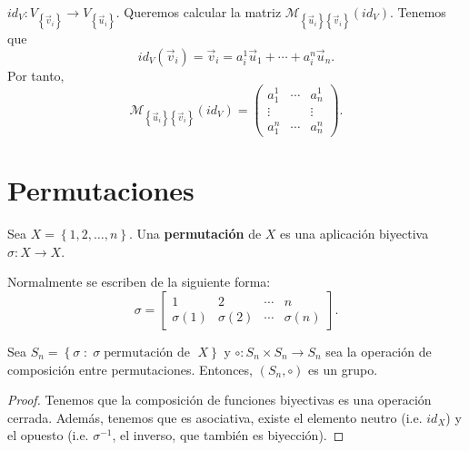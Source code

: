 \begin{eg}
	\normalfont $\displaystyle id _{V}: V_{ \left\{ \vec{v}_{i}\right\} } \to V _{ \left\{ \vec{u}_{i}\right\} } $. Queremos calcular la matriz $\displaystyle \mathcal{M}_{ \left\{ \vec{u}_{i}\right\} \left\{ \vec{v}_{i}\right\} }\left(id _{V}\right) $. Tenemos que 
	\[id _{V}\left(\vec{v}_{i}\right) = \vec{v}_{i} = a^{1}_{i}\vec{u}_{1} + \cdots +a^{n}_{i}\vec{u}_{n} .\]
Por tanto, 
\[\mathcal{M}_{ \left\{ \vec{u}_{i}\right\} \left\{ \vec{v}_{i}\right\} }\left(id _{V}\right) = \begin{pmatrix} a^{1}_{1} & \cdots & a^{1}_{n}\\
\vdots & & \vdots \\
a^{n}_{1} & \cdots & a^{n}_{n}\end{pmatrix} .\]
\end{eg}

\section{Permutaciones}
 \begin{fdefinition}[Permutación]
	 \normalfont Sea $\displaystyle X = \left\{ 1, 2, \ldots, n\right\}  $. Una \textbf{permutación} de $\displaystyle X $ es una aplicación biyectiva $\displaystyle \sigma: X \to X $. 
 \end{fdefinition}
 
 Normalmente se escriben de la siguiente forma:
 \[\sigma = \begin{bmatrix} 1 & 2 & \cdots & n\\
 \sigma\left(1\right) & \sigma\left(2\right) & \cdots & \sigma\left(n\right)\end{bmatrix}  .\]
 
 \begin{ftheorem}[]
	 \normalfont Sea $\displaystyle S_{n} = \left\{ \sigma \; : \; \sigma \; \text{permutación de }\; X\right\}  $ y $\displaystyle \circ : S_{n} \times S_{n} \to S_{n} $ sea la operación de composición entre permutaciones. Entonces, $\displaystyle \left(S_{n}, \circ\right) $ es un grupo.
 \end{ftheorem}
 
 \begin{proof}
 Tenemos que la composición de funciones biyectivas es una operación cerrada. Además, tenemos que es asociativa, existe el elemento neutro (i.e. $\displaystyle id _{X} $) y el opuesto (i.e. $\displaystyle \sigma^{-1} $, el inverso, que también es biyección).
 \end{proof}

